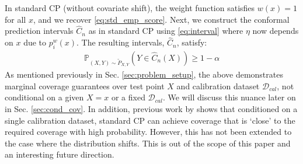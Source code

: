 In standard CP (without covariate shift), the weight function satisfies $w(x)=1$ for all $x$, and we recover \eqref{eq:std_emp_score}. Next, we construct the conformal prediction intervals $\hat{C}_n$ as in standard CP using \eqref{eq:interval} where $\eta$ now depends on $x$ due to $p^w_i(x)$. The resulting intervals, $\hat{C}_n$, satisfy: 
\begin{align*}
     \mathbb{P}_{(X,Y)\sim \tilde{P}_{X, Y}}(Y\in \hat{C}_n(X)) \geq 1-\alpha    
\end{align*}
As mentioned previously in Sec. \ref{sec:problem_setup}, the above demonstrates marginal coverage guarantees over test point $X$ and calibration dataset $\mathcal{D}_{cal}$, not conditional on a given $X=x$ or a fixed $\mathcal{D}_{cal}$.  We will discuss this nuance later on in Sec. \ref{sec:cond_cov}. In addition, previous work by \citeauthor{vovk2012} shows that conditioned on a single calibration dataset, standard CP can achieve coverage that is `close' to the required coverage with high probability. However, this has not been extended to the case where the distribution shifts. This is out of the scope of this paper and an interesting future direction. 



